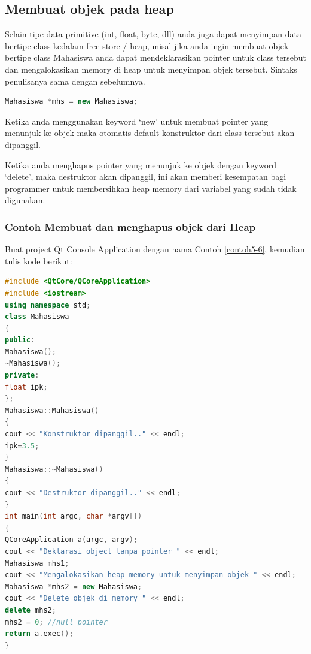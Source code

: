 \subsection{Membuat objek pada heap}\label{membuat-objek-pada-heap}

Selain tipe data primitive (int, float, byte, dll) anda juga dapat
menyimpan data bertipe class kedalam free store / heap, misal jika anda
ingin membuat objek bertipe class Mahasiswa anda dapat mendeklarasikan
pointer untuk class tersebut dan mengalokasikan memory di heap untuk
menyimpan objek tersebut. Sintaks penulisanya sama dengan sebelumnya.

\begin{lstlisting}[language=c++, numbers=none]
Mahasiswa *mhs = new Mahasiswa;
\end{lstlisting}

Ketika anda menggunakan keyword `new' untuk membuat pointer yang
menunjuk ke objek maka otomatis default konstruktor dari class tersebut
akan dipanggil.

Ketika anda menghapus pointer yang menunjuk ke objek dengan keyword
`delete', maka destruktor akan dipanggil, ini akan memberi kesempatan
bagi programmer untuk membersihkan heap memory dari variabel yang sudah
tidak digunakan.

\subsubsection*{Contoh  Membuat dan menghapus objek dari Heap}

Buat project Qt Console Application dengan nama Contoh \ref{contoh5-6}, kemudian tulis
kode berikut:

\begin{lstlisting}[language=c++, caption=Membuat dan menghapus objek dari Heap, label=contoh5-6]
#include <QtCore/QCoreApplication>
#include <iostream>
using namespace std;
class Mahasiswa
{
public:
Mahasiswa();
~Mahasiswa();
private:
float ipk;
};
Mahasiswa::Mahasiswa()
{
cout << "Konstruktor dipanggil.." << endl;
ipk=3.5;
}
Mahasiswa::~Mahasiswa()
{
cout << "Destruktor dipanggil.." << endl;
}
int main(int argc, char *argv[])
{
QCoreApplication a(argc, argv);
cout << "Deklarasi object tanpa pointer " << endl;
Mahasiswa mhs1;
cout << "Mengalokasikan heap memory untuk menyimpan objek " << endl;
Mahasiswa *mhs2 = new Mahasiswa;
cout << "Delete objek di memory " << endl;
delete mhs2;
mhs2 = 0; //null pointer
return a.exec();
}
\end{lstlisting}

